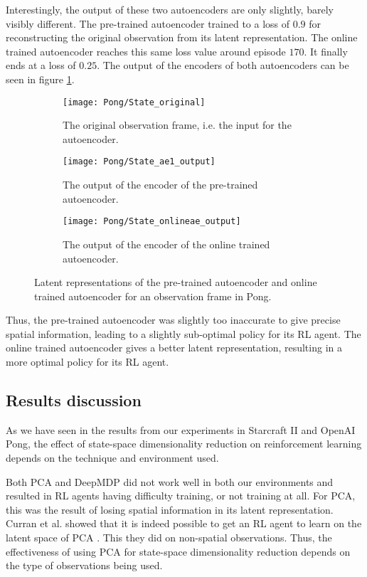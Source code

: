 Interestingly, the output of these two autoencoders are only slightly, barely visibly different. The pre-trained autoencoder trained to a loss of $0.9$ for reconstructing the original observation from its latent representation. The online trained autoencoder reaches this same loss value around episode $170$. It finally ends at a loss of $0.25$. The output of the encoders of both autoencoders can be seen in figure \ref{fig:online-ae-output-pong}.

\begin{figure}[h]
	\centering
	\begin{subfigure}[b]{0.45\textwidth}
		\texttt{[image: Pong/State\_original]}
		\caption{The original observation frame, i.e. the input for the autoencoder.}
	\end{subfigure}\hfill
	\begin{subfigure}[b]{0.45\textwidth}
		\texttt{[image: Pong/State\_ae1\_output]}
		\caption{The output of the encoder of the pre-trained autoencoder.}
	\end{subfigure}\medskip
	\begin{subfigure}[b]{0.45\textwidth}
		\texttt{[image: Pong/State\_onlineae\_output]}
		\caption{The output of the encoder of the online trained autoencoder.}
	\end{subfigure}
	\caption{Latent representations of the pre-trained autoencoder and online trained autoencoder for an observation frame in Pong.}
	\label{fig:online-ae-output-pong}
\end{figure}

Thus, the pre-trained autoencoder was slightly too inaccurate to give precise spatial information, leading to a slightly sub-optimal policy for its RL agent. The online trained autoencoder gives a better latent representation, resulting in a more optimal policy for its RL agent.

\clearpage
\subsection{Results discussion}\label{research-discussion}
As we have seen in the results from our experiments in Starcraft II and OpenAI Pong, the effect of state-space dimensionality reduction on reinforcement learning depends on the technique and environment used. 

Both PCA and DeepMDP did not work well in both our environments and resulted in RL agents having difficulty training, or not training at all. For PCA, this was the result of losing spatial information in its latent representation. Curran et al. showed that it is indeed possible to get an RL agent to learn on the latent space of PCA \cite{mario}. This they did on non-spatial observations. Thus, the effectiveness of using PCA for state-space dimensionality reduction depends on the type of observations being used.

